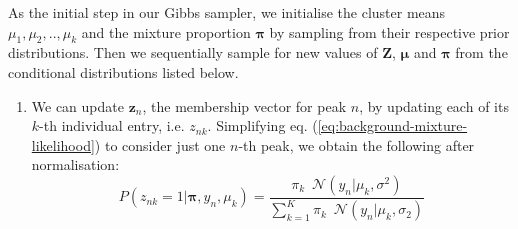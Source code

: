 As the initial step in our Gibbs sampler, we initialise the cluster means $\mu_1,\mu_2,..,\mu_k$ and the mixture proportion $\boldsymbol{\pi}$ by sampling from their respective prior distributions. Then we sequentially sample for new values of $\boldsymbol{Z}$, $\boldsymbol{\mu}$ and $\boldsymbol{\pi}$ from the conditional distributions listed below. 

\begin{enumerate}

\item We can update $\boldsymbol{z}_n$, the membership vector for peak $n$, by updating each of its $k$-th individual entry, i.e. $z_{nk}$. Simplifying eq. (\ref{eq:background-mixture-likelihood}) to consider just one $n$-th peak, we obtain the following after normalisation:
\begin{equation}
P(z_{nk}=1 \vert \boldsymbol{\pi}, y_n, \mu_k) = \frac{\pi_k \enspace \mathcal{N}(y_n \vert \mu_k, \sigma^2)}{\sum_{k=1}^K \pi_k \enspace \mathcal{N}(y_n \vert \mu_k, \sigma_2)}
\label{eq:background-mixture-conditional-z}
\end{equation}


\end{enumerate}
